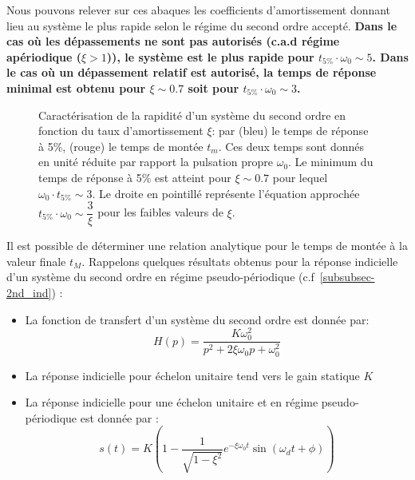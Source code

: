 Nous pouvons relever sur ces abaques les coefficients d'amortissement donnant
lieu au système le plus rapide selon le régime du second ordre accepté.
\textbf{Dans le cas où les dépassements ne sont pas autorisés (c.a.d régime 
apériodique ($\xi>1$)), le système est le plus rapide pour 
$t_{5\%}\cdot\omega_0\sim5$. Dans le cas où un dépassement relatif est 
autorisé, la temps de réponse minimal est obtenu pour $\xi\sim 0.7$ soit
pour $t_{5\%}\cdot\omega_0\sim3$.}
\begin{figure}
    \centering
    
    \caption{Caractérisation de la rapidité d'un système du second ordre en
             fonction du taux d'amortissement $\xi$: par
             (bleu) le temps de réponse à 5\%,  
             (rouge) le temps de montée $t_m$.
             Ces deux temps sont donnés en unité réduite
             par rapport la pulsation propre $\omega_0$.
             Le minimum du temps de réponse à 5\% est atteint pour $\xi\sim0.7$ 
             pour lequel $\omega_0\cdot t_{5\%}\sim3$.
             Le droite en pointillé représente l'équation approchée 
             $t_{5\%}\cdot\omega_0\sim\dfrac{3}{\xi}$ pour les faibles valeurs 
             de $\xi$.
             \label{fig-2nd_temps_reponse_1}}
\end{figure}
\clearpage
Il est possible de déterminer une relation analytique pour le temps
de montée à la valeur finale $t_{M}$. Rappelons quelques résultats obtenus
pour la réponse indicielle d'un système du second ordre en régime 
pseudo-périodique (c.f~\cref{subsubsec-2nd_ind}) :
\begin{itemize}
    \item La fonction de transfert d'un système du second ordre est donnée
          par:
    \[ 
    H(p)=\dfrac{K\omega_0^2}{p^2+2\xi\omega_0p+\omega_0^2}
    \]
    \item La réponse indicielle pour échelon unitaire tend vers 
          le gain statique $K$ 
    \item La réponse indicielle pour une échelon unitaire et en régime 
          pseudo-périodique est donnée par : 
    \[
    s(t) = K \left( 1 - 
           \dfrac{1}{\sqrt{1-\xi^2}} 
           e^{-\xi\omega_0 t}
           \sin{(\omega_d t+\phi)}\right)\label{eq-2-3_2nd} 
    \]
\end{itemize}
